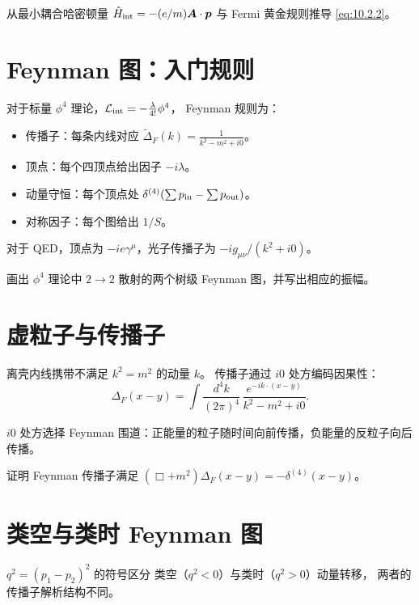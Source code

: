 \begin{exercise}
从最小耦合哈密顿量
$\hat H_{\rm int}=-(e/m)\bm{A}\cdot\bm{p}$ 与 Fermi 黄金规则推导 \eqref{eq:10.2.2}。
\end{exercise}

\section{Feynman 图：入门规则}

对于标量 $\phi^4$ 理论，$\mathcal L_{\rm int}=-\frac{\lambda}{4!}\phi^4$，
Feynman 规则为：
\begin{itemize}
\item 传播子：每条内线对应 $\tilde\Delta_F(k)=\frac{1}{k^2-m^2+i0}$。
\item 顶点：每个四顶点给出因子 $-i\lambda$。
\item 动量守恒：每个顶点处 $\delta^{(4)}(\sum p_{\rm in}-\sum p_{\rm out})$。
\item 对称因子：每个图给出 $1/S$。
\end{itemize}

对于 QED，顶点为 $-ie\gamma^\mu$，光子传播子为
$-ig_{\mu\nu}/(k^2+i0)$。

\begin{exercise}
画出 $\phi^4$ 理论中 $2\to2$ 散射的两个树级 Feynman 图，并写出相应的振幅。
\end{exercise}

\section{虚粒子与传播子}

离壳内线携带不满足 $k^2=m^2$ 的动量 $k$。
传播子通过 $i0$ 处方编码因果性：
\begin{equation}
\Delta_F(x-y) = \int\frac{d^4k}{(2\pi)^4}\,
\frac{e^{-ik\cdot(x-y)}}{k^2-m^2+i0}.
\label{eq:10.4.1}
\end{equation}

$i0$ 处方选择 Feynman 围道：正能量的粒子随时间向前传播，负能量的反粒子向后传播。

\begin{exercise}
证明 Feynman 传播子满足
$(\Box+m^2)\Delta_F(x-y)=-\delta^{(4)}(x-y)$。
\end{exercise}

\section{类空与类时 Feynman 图}

$q^2=(p_1-p_2)^2$ 的符号区分
类空（$q^2<0$）与类时（$q^2>0$）动量转移，
两者的传播子解析结构不同。

